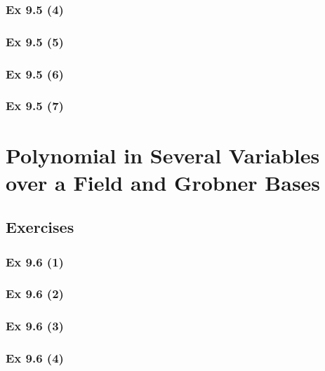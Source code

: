 \subsubsection{Ex 9.5 (4)}\label{sec:Ex_9.5.4}

\subsubsection{Ex 9.5 (5)}\label{sec:Ex_9.5.5}

\subsubsection{Ex 9.5 (6)}\label{sec:Ex_9.5.6}

\subsubsection{Ex 9.5 (7)}\label{sec:Ex_9.5.7}

\newpage		%

\section{Polynomial in Several Variables over a Field and Grobner Bases}\label{sec:9.6}	
\subsection*{Exercises}\label{sec:9.6_Exercises}

\subsubsection{Ex 9.6 (1)}\label{sec:Ex_9.6.1}

\subsubsection{Ex 9.6 (2)}\label{sec:Ex_9.6.2}

\subsubsection{Ex 9.6 (3)}\label{sec:Ex_9.6.3}

\subsubsection{Ex 9.6 (4)}\label{sec:Ex_9.6.4}


